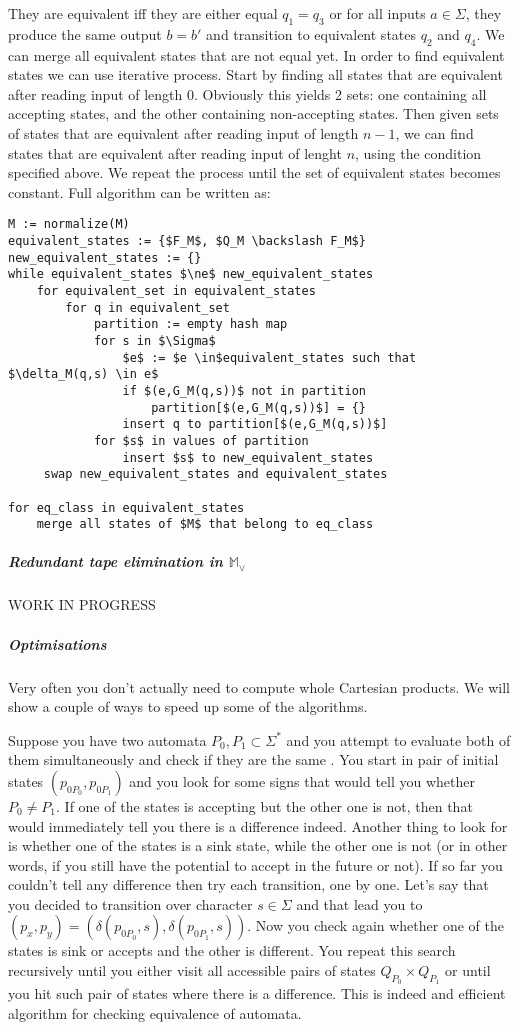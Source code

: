 \documentclass[12pt]{article}
\begin{document}
They are equivalent iff they are either equal $q_1=q_3$ or for all inputs $a\in\Sigma$, they produce the same output $b=b'$ and transition  to equivalent states $q_2$ and $q_4$. We can merge all equivalent states that are not equal yet. In order to find equivalent states we can use iterative process. 
Start by finding all states that are equivalent after reading input of length 0. Obviously this yields 2 sets: one containing all accepting states, and the other containing non-accepting states. Then given sets of states that are equivalent after reading input of length $n-1$, we can find states that are equivalent after reading input of lenght $n$, using the condition specified above. We repeat the process until the set of equivalent states becomes constant.
Full algorithm can be written as:
\begin{lstlisting}
M := normalize(M)
equivalent_states := {$F_M$, $Q_M \backslash F_M$}
new_equivalent_states := {} 
while equivalent_states $\ne$ new_equivalent_states
    for equivalent_set in equivalent_states
        for q in equivalent_set
            partition := empty hash map 
            for s in $\Sigma$
                $e$ := $e \in$equivalent_states such that $\delta_M(q,s) \in e$
                if $(e,G_M(q,s))$ not in partition 
                    partition[$(e,G_M(q,s))$] = {}
                insert q to partition[$(e,G_M(q,s))$]
            for $s$ in values of partition
                insert $s$ to new_equivalent_states
     swap new_equivalent_states and equivalent_states 

for eq_class in equivalent_states
    merge all states of $M$ that belong to eq_class
\end{lstlisting}


\subparagraph{Redundant tape elimination in $\mathbb{M}_\vee$} 
WORK IN PROGRESS


\subparagraph{Optimisations}
Very often you don't actually need to compute whole Cartesian products. We will show a couple of ways to speed up some of the algorithms.


Suppose you have two automata $P_0,P_1 \subset \Sigma^*$ and you attempt to evaluate both of them simultaneously and check if they are the same . You start in pair of initial states $(p_{0P_0},p_{0P_1})$ and you look for some signs that would tell you whether $P_0 \ne P_1$. If one of the states is accepting but the other one is not, then that would immediately tell you there is a difference indeed. Another thing to look for is whether one of the states is a sink state, while the other one is not (or in other words, if you still have the potential to accept in the future or not). If so far you couldn't tell any difference then try each transition, one by one. Let's say that you decided to transition over character $s \in \Sigma$ and that lead you to $(p_x,p_y) = (\delta(p_{0P_0},s),\delta(p_{0P_1},s))$. Now you check again whether one of the states is sink or accepts and the other is different. You repeat this search recursively until you either visit all accessible pairs of states $Q_{P_0} \times Q_{P_1}$ or until you hit such pair of states where there is a difference. This is indeed and efficient algorithm for checking equivalence of automata. 
\end{document}
